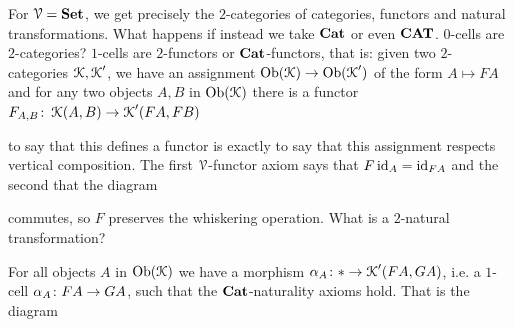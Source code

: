 \documentclass[a4paper,11pt,oneside,openany]{scrbook}
\begin{document}
\begin{exmp}
	For $\operatorname{\mathcal{V}}={\normalfont\textbf{Set}}$, we get precisely the $2$-categories of categories, functors
    and natural transformations. What happens if instead we take ${\normalfont\textbf{Cat}}$ or even ${\normalfont\textbf{CAT}}$.
	$0$-cells are $2$-categories? $1$-cells are $2$-functors or ${\normalfont\textbf{Cat}}$-functors,
    that is: given two $2$-categories $\operatorname{\mathcal{K}},\operatorname{\mathcal{K}}'$, we have an assignment
	$\operatorname{Ob}(\operatorname{\mathcal{K}}) \to \operatorname{Ob}(\operatorname{\mathcal{K}}')$ of the form $A \mapsto FA$ and for any two objects
    $A,B$ in $\operatorname{Ob}(\operatorname{\mathcal{K}})$ there is a functor $F_{A,B} \colon \operatorname{\mathcal{K}}(A,B) \to \operatorname{\mathcal{K}}'(FA,FB)$
	\begin{center}
	\end{center}
	to say that this defines a functor is exactly to say that this assignment
    respects vertical composition. The first $\operatorname{\mathcal{V}}$-functor axiom says that
    $F\operatorname{id}_{A}=\operatorname{id}_{FA}$
	and the second that the diagram
	\begin{center}
	\end{center}
	commutes, so $F$ preserves the whiskering operation. What is a $2$-natural
    transformation?
	\begin{center}
	\end{center}
	For all objects $A$ in $\operatorname{Ob}(\operatorname{\mathcal{K}})$ we have a morphism $\alpha_{A} \colon \ast \to \operatorname{\mathcal{K}}'(FA,GA)$, i.e. a $1$-cell $\alpha_{A} \colon FA \to GA$, such that
	the ${\normalfont\textbf{Cat}}$-naturality axioms hold. That is the diagram
	\begin{center}
\end{center}
\end{exmp}
\end{document}
